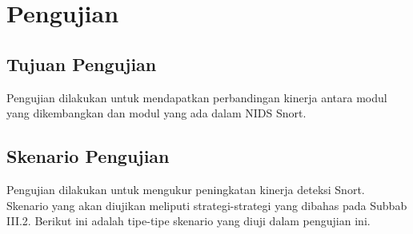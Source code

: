 


\section{Pengujian}

  \subsection{Tujuan Pengujian}
    Pengujian dilakukan untuk mendapatkan perbandingan kinerja antara modul yang dikembangkan dan modul yang ada dalam NIDS Snort. 

  \subsection{Skenario Pengujian}
  
    Pengujian dilakukan untuk mengukur peningkatan kinerja deteksi Snort. Skenario yang akan diujikan meliputi strategi-strategi yang dibahas pada Subbab III.2. Berikut ini adalah tipe-tipe skenario yang diuji dalam pengujian ini.

